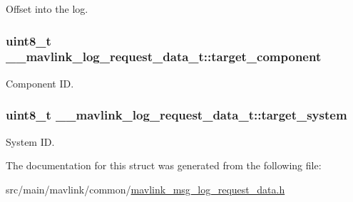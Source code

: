 Offset into the log. 

\hypertarget{struct____mavlink__log__request__data__t_a8545bbedbb775bf25f278ddbe3c8a876}{
\subsubsection[{target\+\_\+component}]{\setlength{\rightskip}{0pt plus 5cm}uint8\+\_\+t \+\_\+\+\_\+mavlink\+\_\+log\+\_\+request\+\_\+data\+\_\+t\+::target\+\_\+component}}\label{struct____mavlink__log__request__data__t_a8545bbedbb775bf25f278ddbe3c8a876}


Component I\+D. 

\hypertarget{struct____mavlink__log__request__data__t_aa9980b037a382ce22d5aafba5138dee3}{
\subsubsection[{target\+\_\+system}]{\setlength{\rightskip}{0pt plus 5cm}uint8\+\_\+t \+\_\+\+\_\+mavlink\+\_\+log\+\_\+request\+\_\+data\+\_\+t\+::target\+\_\+system}}\label{struct____mavlink__log__request__data__t_aa9980b037a382ce22d5aafba5138dee3}


System I\+D. 



The documentation for this struct was generated from the following file\+:\begin{DoxyCompactItemize}
\item 
src/main/mavlink/common/\hyperlink{mavlink__msg__log__request__data_8h}{mavlink\+\_\+msg\+\_\+log\+\_\+request\+\_\+data.\+h}\end{DoxyCompactItemize}
